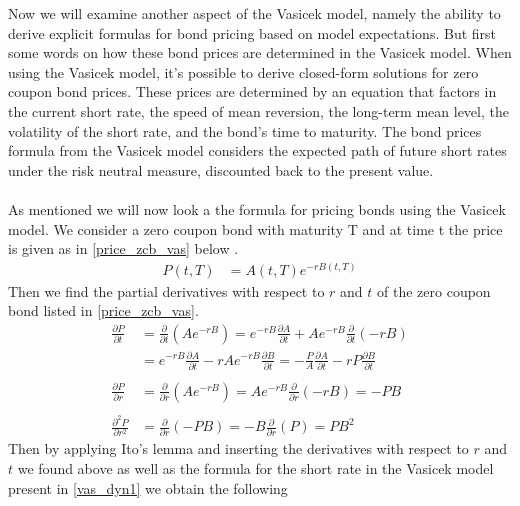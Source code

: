 Now we will examine another aspect of the Vasicek model, namely the ability to derive explicit formulas
for bond pricing based on model expectations.
But first some words on how these bond prices are determined in the Vasicek model. 
When using the Vasicek model, it's possible to derive closed-form solutions for zero coupon bond prices. 
These prices are determined by an equation that factors in the current short rate, the speed of mean reversion,
the long-term mean level, the volatility of the short rate, and the bond’s time to maturity.
The bond prices formula from the Vasicek model considers the expected path of future short 
rates under the risk neutral measure, discounted back to the present value. 
\\\\
As mentioned we will now look a the formula for pricing bonds using the Vasicek model. We consider a zero coupon bond
with maturity T and at time t the price is given as in \autoref{price_zcb_vas} below \cite{Bjork}.
\begin{align}
    P(t,T) &= A(t,T) e^{-rB(t,T)} 
    \label{price_zcb_vas} 
\end{align}
Then we find the partial derivatives with respect to $r$ and $t$ of the zero coupon bond listed in \autoref{price_zcb_vas}.
\begin{align*}
    \frac{\partial P}{\partial t} &= \frac{\partial}{\partial t} (Ae^{-rB}) 
    = e^{-rB} \frac{\partial A}{\partial t} + Ae^{-rB} \frac{\partial}{\partial t} (-rB) \\
    &= e^{-rB} \frac{\partial A}{\partial t} - rAe^{-rB} \frac{\partial B}{\partial t} = 
    - \frac{P}{A} \frac{\partial A}{\partial t} - rP \frac{\partial B}{\partial t}
    \\\\
    \frac{\partial P}{\partial r} &= \frac{\partial}{\partial r} (Ae^{-rB}) 
    = Ae^{-rB} \frac{\partial}{\partial r} (-rB) = -PB 
    \\\\
    \frac{\partial^2 P}{\partial r^2} &= \frac{\partial}{\partial r} (-PB) = -B \frac{\partial}{\partial r} (P) = PB^2
\end{align*}
Then by applying Ito's lemma \cite{Bjork} and inserting the derivatives with respect to $r$ and $t$ we found above as well as
 the formula for the short rate in the Vasicek model present in \autoref{vas_dyn1} we obtain the following
